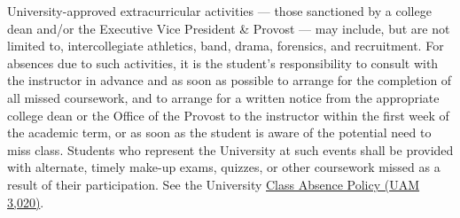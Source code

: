 University-approved extracurricular activities --- those sanctioned by a college
dean and/or the Executive Vice President \& Provost --- may include, but are not
limited to, intercollegiate athletics, band, drama, forensics, and recruitment.
For absences due to such activities, it is the student's responsibility to consult
with the instructor in advance and as soon as possible to arrange for the
completion of all missed coursework, and to arrange for a written notice from the
appropriate college dean or the Office of the Provost to the instructor within the
first week of the academic term, or as soon as the student is aware of the
potential need to miss class. Students who represent the University at such events
shall be provided with alternate, timely make-up exams, quizzes, or other
coursework missed as a result of their participation. See the University
\href{https://www.unr.edu/administrative-manual/3000-3999-students/3020-class-absence-policy}{Class
Absence Policy (UAM 3,020)}.
